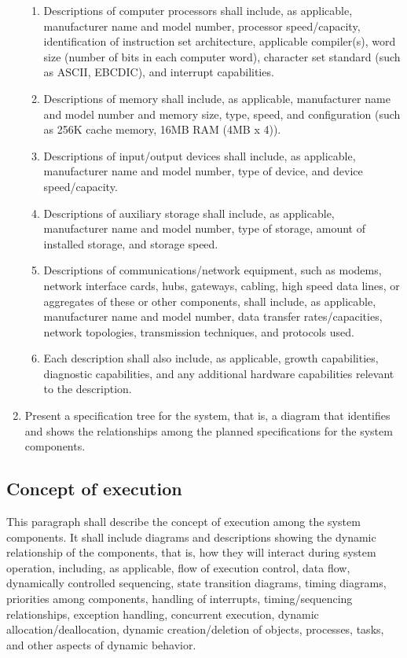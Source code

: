 \begin{enumerate}
  \begin{enumerate}
  \itemsep1pt\parskip0pt
  \item
    Descriptions of computer processors shall include, as applicable,
    manufacturer name and model number, processor speed/capacity,
    identification of instruction set architecture, applicable
    compiler(s), word size (number of bits in each computer word),
    character set standard (such as ASCII, EBCDIC), and interrupt
    capabilities.
  \item
    Descriptions of memory shall include, as applicable, manufacturer
    name and model number and memory size, type, speed, and
    configuration (such as 256K cache memory, 16MB RAM (4MB x 4)).
  \item
    Descriptions of input/output devices shall include, as applicable,
    manufacturer name and model number, type of device, and device
    speed/capacity.
  \item
    Descriptions of auxiliary storage shall include, as applicable,
    manufacturer name and model number, type of storage, amount of
    installed storage, and storage speed.
  \item
    Descriptions of communications/network equipment, such as modems,
    network interface cards, hubs, gateways, cabling, high speed data
    lines, or aggregates of these or other components, shall include, as
    applicable, manufacturer name and model number, data transfer
    rates/capacities, network topologies, transmission techniques, and
    protocols used.
  \item
    Each description shall also include, as applicable, growth
    capabilities, diagnostic capabilities, and any additional hardware
    capabilities relevant to the description.
  \end{enumerate}
\item
  Present a specification tree for the system, that is, a diagram that
  identifies and shows the relationships among the planned
  specifications for the system components.
\end{enumerate}

\subsection{Concept of execution}

This paragraph shall describe the concept of execution among the system
components. It shall include diagrams and descriptions showing the
dynamic relationship of the components, that is, how they will interact
during system operation, including, as applicable, flow of execution
control, data flow, dynamically controlled sequencing, state transition
diagrams, timing diagrams, priorities among components, handling of
interrupts, timing/sequencing relationships, exception handling,
concurrent execution, dynamic allocation/deallocation, dynamic
creation/deletion of objects, processes, tasks, and other aspects of
dynamic behavior.

